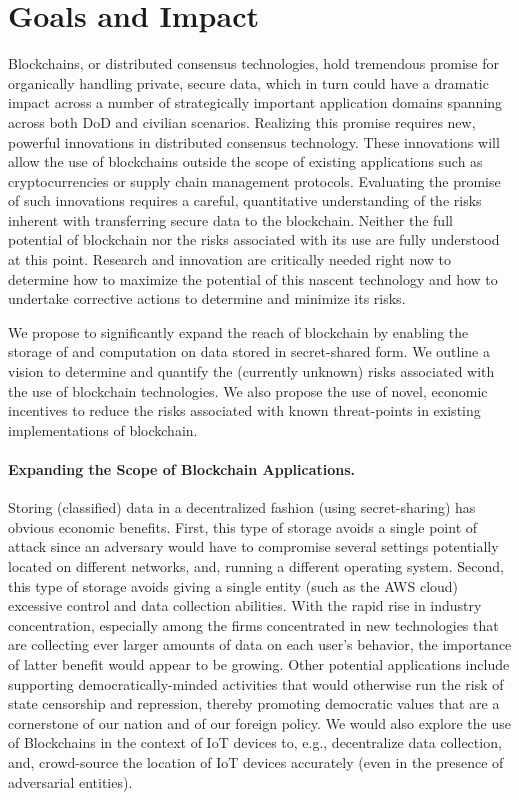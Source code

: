 \documentclass[runningheads, 12pt]{article}
\begin{document}


\vspace{-5pt}
\section{Goals and Impact}
\vspace{-4pt}

Blockchains, or distributed consensus technologies, hold tremendous promise for organically handling private, secure data, which in turn could have a dramatic impact across a number of strategically important application domains spanning across both DoD and civilian scenarios. Realizing this promise requires new, powerful innovations in distributed consensus technology. These innovations will allow the use of blockchains outside the scope of existing applications such as cryptocurrencies or supply chain management protocols. Evaluating the promise of such innovations requires a careful, quantitative understanding of the risks inherent with transferring secure data to the blockchain. Neither the full potential of blockchain nor the risks associated with its use are fully understood at this point. Research and innovation are critically needed right now to determine how to maximize the potential of this nascent technology and how to undertake corrective actions to determine and minimize its risks.

We propose to significantly expand the reach of blockchain by enabling the storage of and computation on data stored in secret-shared form. We outline a vision to determine and quantify the (currently unknown) risks associated with the use of blockchain technologies. We also propose the use of novel, economic incentives to reduce the risks associated with known threat-points in existing implementations of blockchain.

\vspace{-5pt}
\paragraph{Expanding the Scope of Blockchain Applications.} Storing (classified) data in a decentralized fashion (using secret-sharing) has obvious economic benefits. First, this type of storage avoids a single point of attack since an adversary would have to compromise several settings potentially located on different networks, and, running a different operating system. Second, this type of storage avoids giving a single entity (such as the AWS cloud) excessive control and data collection abilities. With the rapid rise in industry concentration, especially among the firms concentrated in new technologies that are collecting ever larger amounts of data on each user's behavior, the importance of latter benefit would appear to be growing. Other potential applications include supporting democratically-minded activities that would otherwise run the risk of state censorship and repression, thereby promoting democratic values that are a cornerstone of our nation and of our foreign policy. We would also explore the use of Blockchains in the context of IoT devices to, e.g., decentralize data collection, and, crowd-source the location of IoT devices accurately (even in the presence of adversarial entities).
\end{document}
